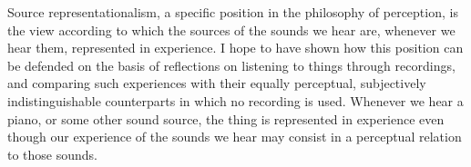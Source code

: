\documentclass[sloppy, journal, git, bytitle, dodraft]{humapap}
\begin{document}
\sect  Source representationalism, a specific position in the philosophy of perception, is the view according to which the sources of the sounds we hear are, whenever we hear them, represented in experience. I hope to have shown how this position can be defended on the basis of reflections on listening to things through recordings, and comparing such experiences with their equally perceptual, subjectively indistinguishable counterparts in which no recording is used. Whenever we hear a piano, or some other sound source, the thing is represented in experience even though our experience of the sounds we hear may consist in a perceptual relation to those sounds. 





\end{document}

